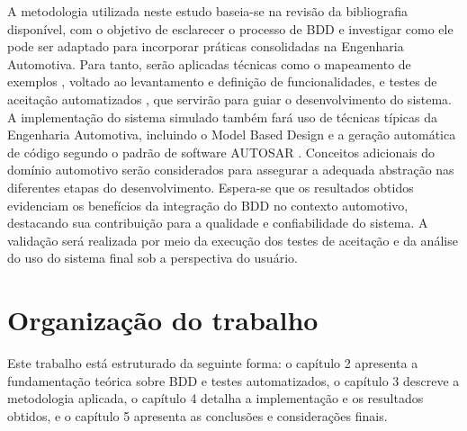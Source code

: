 A metodologia utilizada neste estudo baseia-se na revisão da bibliografia disponível, com o objetivo de esclarecer o processo de BDD e investigar como ele pode 
ser adaptado para incorporar práticas consolidadas na Engenharia Automotiva. Para tanto, serão aplicadas técnicas como o mapeamento de exemplos 
\cite{Lawrence2019cucumber, cucumberExampleMapping}
, voltado ao levantamento e definição de funcionalidades, e testes de aceitação automatizados 
\cite{studyBDD}
, que servirão para guiar o desenvolvimento do sistema.
A implementação do sistema simulado também fará uso de técnicas típicas da Engenharia Automotiva, incluindo o Model Based Design \cite{sangiovanni2001platform, mathworks2021mbd}
e a geração automática de código segundo o padrão de software AUTOSAR 
\cite{autosarClassic}. Conceitos adicionais do domínio automotivo serão considerados para 
assegurar a adequada abstração nas diferentes etapas do desenvolvimento.
Espera-se que os resultados obtidos evidenciam os benefícios da integração do BDD no contexto automotivo, destacando sua contribuição para a qualidade e 
confiabilidade do sistema. A validação será realizada por meio da execução dos testes de aceitação e da análise do uso do sistema final sob a perspectiva do usuário.

\section{Organização do trabalho}
Este trabalho está estruturado da seguinte forma: o capítulo 2 apresenta a fundamentação teórica sobre BDD e testes automatizados, 
o capítulo 3 descreve a metodologia aplicada, o capítulo 4 detalha a implementação e os resultados obtidos, e o capítulo 5 apresenta as conclusões e considerações finais.
